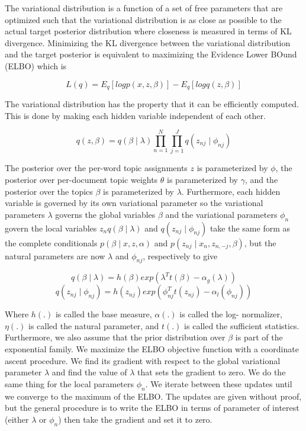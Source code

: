 \documentclass[12pt]{report}
\begin{document}
The variational distribution is a function of a set of free parameters that are optimized such that the variational distribution is as close as possible to the 
actual target posterior distribution where closeness is measured in terms of KL divergence.
Minimizing the KL divergence between the variational distribution and the target
posterior is equivalent to maximizing the Evidence Lower BOund (ELBO) which is

\begin{equation}
L(q) = E_q [log p(x, z, \beta)] -  E_q [log q(z, \beta)]  
\end{equation}

The variational distribution has the property that it can be efficiently
computed. This is done by making each hidden variable independent of each other.

\begin{equation}
q(z, \beta) = q(\beta \mid \lambda) \prod\limits_{n=1}^N \prod\limits_{j=1}^J q(z_{nj} \mid \phi_{nj})   
\end{equation}

The posterior over the per-word topic assignments $z$ is parameterized by
$\phi$, the posterior over per-document topic weights $\theta$ is parameterized
by $\gamma$, and the posterior over the topics $\beta$ is parameterized by
$\lambda$. Furthermore, each hidden variable is governed by its own variational
parameter so the variational parameters $\lambda$ governs the global variables
$\beta$ and the variational parameters $\phi_n$ govern the local variables $z_n
q(\beta \mid \lambda)$ and $q(z_{nj} \mid \phi_{nj})$ take the same form as the
complete conditionals $p(\beta \mid x, z, \alpha)$ and $p(z_{nj} \mid x_n, z_{n,
-j}, \beta)$, but the natural parameters are now $\lambda$ and $\phi_{nj}$,
respectively to give

\begin{equation}
q(\beta \mid \lambda) = h(\beta) exp(\lambda^T t(\beta) - \alpha_g(\lambda))
\end{equation}
\begin{equation}
q(z_{nj} \mid \phi_{nj}) = h(z_{nj}) exp(\phi_{nj}^T t(z_{nj}) - \alpha_l(\phi_{nj}))
\end{equation}

Where $h(.)$ is called the base measure, $\alpha(.)$ is called the log-
normalizer, $\eta(.)$ is called the natural parameter, and $t(.)$ is called the
sufficient statistics. Furthermore, we also assume that the prior distribution
over $\beta$ is part of the exponential family. We maximize the ELBO objective
function with a coordinate ascent procedure. We find its gradient with respect
to the global variational parameter $\lambda$ and find the value of $\lambda$
that sets the gradient to zero. We do the same thing for the local parameters
$\phi_n$. We iterate between these updates until we converge to the maximum of
the ELBO. The updates are given without proof, but the general procedure is to
write the ELBO in terms of parameter of interest (either $\lambda$ or $\phi_n$)
then take the gradient and set it to zero.
\end{document}
